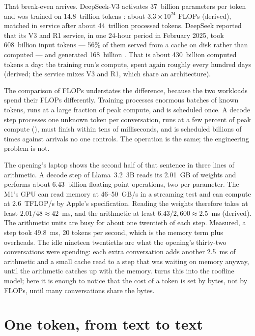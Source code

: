 That break-even arrives. DeepSeek-V3 activates 37~billion parameters per token
and was trained on 14.8~trillion tokens \cite{deepseek2024v3}: about
$3.3\times10^{24}$ FLOPs (derived), matched in service after about 44~trillion
processed tokens. DeepSeek reported that its V3 and R1 service, in one 24-hour
period in February 2025, took 608~billion input tokens --- 56\% of them served
from a cache on disk rather than computed --- and generated 168~billion
\cite{deepseek2025inference}. That is about 430~billion computed tokens a day:
the training run's compute, spent again roughly every hundred days (derived;
the service mixes V3 and R1, which share an architecture).

The comparison of FLOPs understates the difference, because the two workloads
spend their FLOPs differently. Training processes enormous batches of known
tokens, runs at a large fraction of peak compute, and is scheduled once. A
decode step processes one unknown token per conversation, runs at a few
percent of peak compute (), must finish within tens of
milliseconds, and is scheduled billions of times against arrivals no one
controls. The operation is the same; the engineering problem is not.

The opening's laptop shows the second half of that sentence in three lines of
arithmetic. A decode step of Llama~3.2~3B reads its 2.01~GB of weights and
performs about 6.43~billion floating-point operations, two per parameter. The
M1's GPU can read memory at 46--50~GB/s in a streaming test and can compute at
2.6~TFLOP/s by Apple's specification. Reading the weights therefore takes at
least $2.01 / 48 \approx 42$~ms, and the arithmetic at least $6.43 / 2{,}600
\approx 2.5$~ms (derived). The arithmetic units are busy for about one
twentieth of each step. Measured, a step took 49.8~ms, 20 tokens per second,
which is the memory term plus overheads. The idle nineteen twentieths are what
the opening's thirty-two conversations were spending: each extra conversation
adds another 2.5~ms of arithmetic and a small cache read to a step that was
waiting on memory anyway, until the arithmetic catches up with the memory.
 turns this into the roofline model; here it is enough to
notice that the cost of a token is set by bytes, not by FLOPs, until many
conversations share the bytes.

\section{One token, from text to text}

